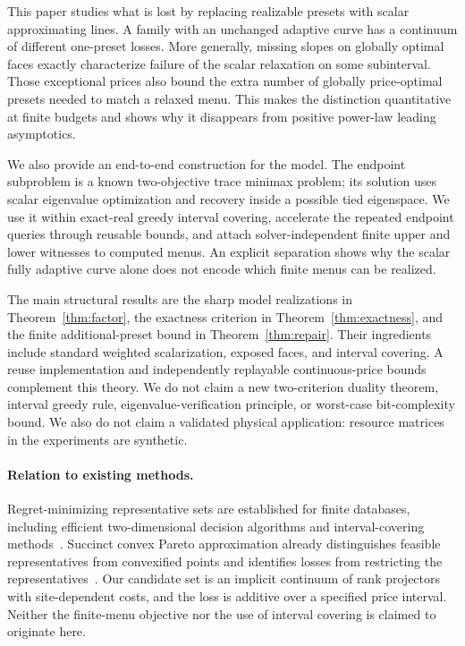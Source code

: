\documentclass[11pt]{article}
\begin{document}
This paper studies what is lost by replacing realizable presets with scalar
approximating lines. A family with an unchanged adaptive curve has a
continuum of different one-preset losses. More generally, missing slopes
on globally optimal faces exactly characterize failure of the scalar
relaxation on some subinterval. Those exceptional prices also bound the
extra number of globally price-optimal presets needed to match a relaxed
menu. This makes the distinction quantitative at finite budgets and shows
why it disappears from positive power-law leading asymptotics.

We also provide an end-to-end construction for the model. The endpoint
subproblem is a known two-objective trace minimax problem; its solution uses
scalar eigenvalue optimization and recovery inside a possible tied
eigenspace. We use it within exact-real greedy interval covering, accelerate
the repeated endpoint queries through reusable bounds, and attach
solver-independent finite upper and lower witnesses to computed menus.
An explicit separation shows why the scalar fully adaptive curve alone
does not encode which finite menus can be realized.

The main structural results are the sharp model realizations in
Theorem~\ref{thm:factor}, the exactness criterion in
Theorem~\ref{thm:exactness}, and the finite additional-preset bound in
Theorem~\ref{thm:repair}. Their ingredients include standard weighted
scalarization, exposed faces, and interval covering. A reuse implementation
and independently replayable continuous-price bounds complement this theory.
We do not claim a new two-criterion
duality theorem, interval greedy rule, eigenvalue-verification principle,
or worst-case bit-complexity bound. We also do not claim a validated physical
application: resource matrices in the experiments are synthetic.

\paragraph{Relation to existing methods.}
Regret-minimizing representative sets are established for finite databases,
including efficient two-dimensional decision algorithms and interval-covering
methods~\cite{cao2017}. Succinct convex Pareto approximation already distinguishes feasible
representatives from convexified points and identifies losses from
restricting the representatives~\cite{diakonikolas2008,diakonikolas2011}. Our candidate set
is an implicit continuum of rank projectors with site-dependent costs,
and the loss is additive over a specified price interval. Neither the
finite-menu objective nor the use of interval covering is claimed to
originate here.
\end{document}
